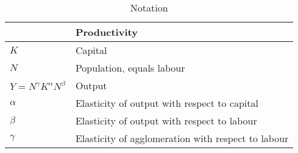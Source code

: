 \begin{longtable}{lp{10cm}}
\caption{Notation}                       \\

\hline           &  \textbf{Productivity} \\ \hline
$K$              &  Capital               \\ 
$N$              &  Population, equals labour \\ %
$Y=N^\gamma K^{\alpha }N^{\beta }$  &  Output \\ %
$\alpha$         &  Elasticity of output with respect to capital          \\
$\beta$          &  Elasticity of output with respect to labour           \\ %
$\gamma$         &  Elasticity of agglomeration with respect to labour    \\ %



\end{longtable}
